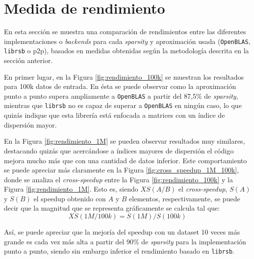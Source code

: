 \section{Medida de rendimiento}
\label{sec:medida_rendimiento}
En esta sección se muestra una comparación de rendimientos entre las diferentes implementaciones o \textit{\gls{backend}s} para cada \textit{sparsity} y aproximación usada (\texttt{OpenBLAS}, \texttt{librsb} o p2p), basados en medidas obtenidas según la metodología descrita en la sección anterior.

En primer lugar, en la Figura \ref{fig:rendimiento_100k} se muestran los resultados para 100k datos de entrada. En ésta se puede observar como la aproximación punto a punto supera ampliamente a \texttt{OpenBLAS} a partir del 87,5\% de \textit{sparsity}, mientras que \texttt{librsb} no es capaz de superar a \texttt{OpenBLAS} en ningún caso, lo que quizás indique que esta librería está enfocada a matrices con un índice de dispersión mayor.

En la Figura \ref{fig:rendimiento_1M} se pueden observar resultados muy similares, destacando quizás que acercándose a índices mayores de dispersión el código mejora mucho más que con una cantidad de datos inferior. Este comportamiento se puede apreciar más claramente en la Figura \ref{fig:cross_speedup_1M_100k}, donde se analiza el \textit{cross-speedup} entre la Figura \ref{fig:rendimiento_100k} y la Figura \ref{fig:rendimiento_1M}. Esto es, siendo $XS(A/B)$ el \textit{cross-speedup}, $S(A)$ y $S(B)$ el speedup obtenido con $A$ y $B$ elementos, respectivamente, se puede decir que la magnitud que se representa gráficamente se calcula tal que:
\begin{equation}
    XS(1M/100k) = S(1M) / S(100k)\nonumber
    \label{eq:cross_speedup}
\end{equation}

Así, se puede apreciar que la mejoría del speedup con un dataset 10 veces más grande es cada vez más alta a partir del 90\% de \textit{sparsity} para la implementación punto a punto, siendo sin embargo inferior el rendimiento basado en \texttt{librsb}.


